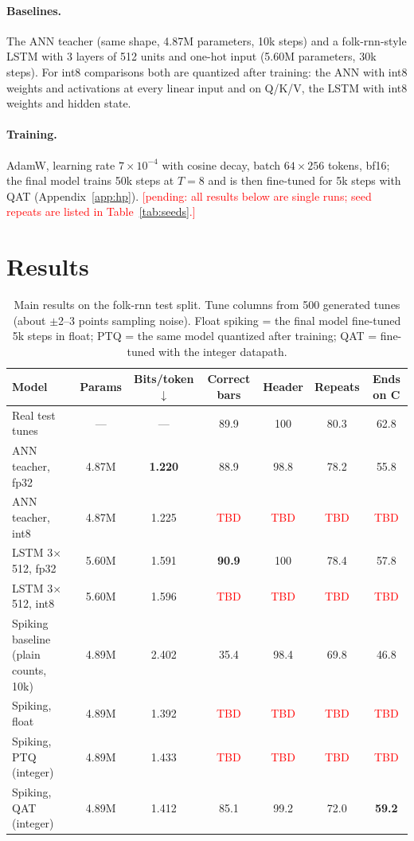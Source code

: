\documentclass[10pt]{article}
\newcommand{\pending}[1]{\textcolor{red}{[pending: #1]}}
\newcommand{\tbd}{\textcolor{red}{TBD}}
\begin{document}
\paragraph{Baselines.} The ANN teacher (same shape, 4.87M parameters, 10k steps) and a folk-rnn-style LSTM
\citep{hochreiter1997lstm} with 3 layers of 512 units and one-hot input (5.60M parameters, 30k steps). For int8
comparisons both are quantized after training: the ANN with int8 weights and activations at every linear input
and on Q/K/V, the LSTM with int8 weights and hidden state.

\paragraph{Training.} AdamW, learning rate $7\times10^{-4}$ with cosine decay, batch $64 \times 256$ tokens, bf16;
the final model trains 50k steps at $T=8$ and is then fine-tuned for 5k steps with QAT (Appendix~\ref{app:hp}).
\pending{all results below are single runs; seed repeats are listed in Table~\ref{tab:seeds}.}

\section{Results}
\label{sec:results}

\begin{table}[t]
\centering
\caption{Main results on the folk-rnn test split. Tune columns from 500 generated tunes (about $\pm$2--3 points
sampling noise). Float spiking = the final model fine-tuned 5k steps in float; PTQ = the same model quantized after
training; QAT = fine-tuned with the integer datapath.}
\label{tab:main}
\small
\begin{tabular}{lcccccc}
\toprule
Model & Params & Bits/token $\downarrow$ & Correct bars & Header & Repeats & Ends on C \\
\midrule
Real test tunes & --- & --- & 89.9 & 100 & 80.3 & 62.8 \\
\midrule
ANN teacher, fp32 & 4.87M & \textbf{1.220} & 88.9 & 98.8 & 78.2 & 55.8 \\
ANN teacher, int8 & 4.87M & 1.225 & \tbd & \tbd & \tbd & \tbd \\
LSTM 3$\times$512, fp32 & 5.60M & 1.591 & \textbf{90.9} & 100 & 78.4 & 57.8 \\
LSTM 3$\times$512, int8 & 5.60M & 1.596 & \tbd & \tbd & \tbd & \tbd \\
\midrule
Spiking baseline (plain counts, 10k) & 4.89M & 2.402 & 35.4 & 98.4 & 69.8 & 46.8 \\
Spiking, float & 4.89M & 1.392 & \tbd & \tbd & \tbd & \tbd \\
Spiking, PTQ (integer) & 4.89M & 1.433 & \tbd & \tbd & \tbd & \tbd \\
Spiking, QAT (integer) & 4.89M & 1.412 & 85.1 & 99.2 & 72.0 & \textbf{59.2} \\
\bottomrule
\end{tabular}
\end{table}
\end{document}
